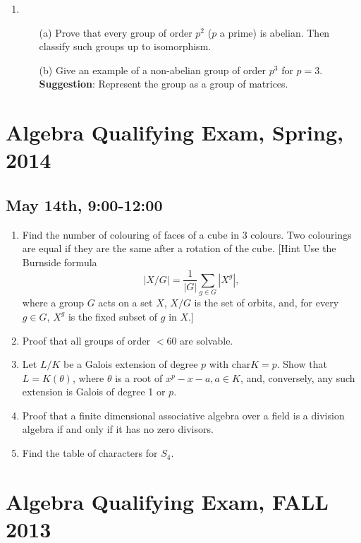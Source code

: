 \documentclass{article}
\begin{document}
\begin{enumerate}
    \item 
    \begin{itemize}
        \item[(a)] Prove that every group of order \(p^2\) (\(p\) a prime) is abelian. Then classify such groups up to isomorphism.
        \item[(b)] Give an example of a non-abelian group of order \(p^3\) for \(p = 3\). \textbf{Suggestion}: Represent the group as a group of matrices.
    \end{itemize}
\end{enumerate}

\section*{Algebra Qualifying Exam, Spring, 2014}
\subsection*{May 14th, 9:00-12:00}

\begin{enumerate}
    \item Find the number of colouring of faces of a cube in 3 colours. Two colourings are equal if they are the same after a rotation of the cube. [Hint Use the Burnside formula \[|X/G|=\frac{1}{|G|}\sum_{g\in G}|X^{g}|,\] where a group \(G\) acts on a set \(X\), \(X/G\) is the set of orbits, and, for every \(g\in G\), \(X^{g}\) is the fixed subset of \(g\) in \(X\).]

    \item Proof that all groups of order \(<60\) are solvable.

    \item Let \(L/K\) be a Galois extension of degree \(p\) with \(\text{char}K=p\). Show that \(L=K(\theta)\), where \(\theta\) is a root of \(x^{p}-x-a,a\in K\), and, conversely, any such extension is Galois of degree 1 or \(p\).

    \item Proof that a finite dimensional associative algebra over a field is a division algebra if and only if it has no zero divisors.

    \item Find the table of characters for \(S_{4}\).
\end{enumerate}

\section*{Algebra Qualifying Exam, FALL 2013}
\end{document}
